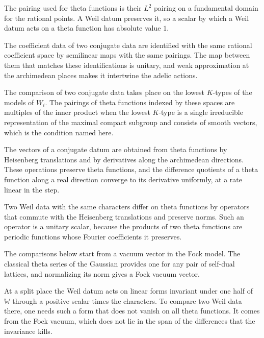 The pairing used for theta functions is their $L^2$ pairing on a fundamental domain for the rational
points. A Weil datum preserves it, so a scalar by which a Weil datum acts on a theta function has
absolute value $1$.

The coefficient data of two conjugate data are identified with the same rational coefficient space by
semilinear maps with the same pairings. The map between them that matches these identifications is
unitary, and weak approximation at the archimedean places makes it intertwine the adelic actions.

The comparison of two conjugate data takes place on the lowest $K$-types of the models of $W_i$. The
pairings of theta functions indexed by these spaces are multiples of the inner product when the
lowest $K$-type is a single irreducible representation of the maximal compact subgroup and consists of
smooth vectors, which is the condition named here.

The vectors of a conjugate datum are obtained from theta functions by Heisenberg translations and by
derivatives along the archimedean directions. These operations preserve theta functions, and the
difference quotients of a theta function along a real direction converge to its derivative uniformly,
at a rate linear in the step.

Two Weil data with the same characters differ on theta functions by operators that commute with the
Heisenberg translations and preserve norms. Such an operator is a unitary scalar, because the
products of two theta functions are periodic functions whose Fourier coefficients it preserves.

The comparisons below start from a vacuum vector in the Fock model. The classical theta series of the
Gaussian provides one for any pair of self-dual lattices, and normalizing its norm gives a Fock vacuum
vector.

At a split place the Weil datum acts on linear forms invariant under one half of $\mathbb W$ through a
positive scalar times the characters. To compare two Weil data there, one needs such a form that does not
vanish on all theta functions. It comes from the Fock vacuum, which does not lie in the span of the
differences that the invariance kills.

